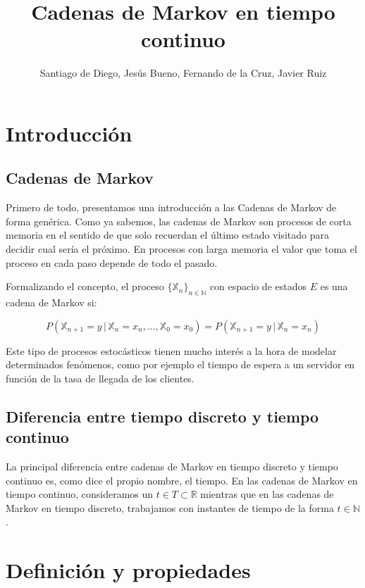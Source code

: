 \documentclass[12pt,a4paper]{article}
\author{Santiago de Diego, Jesús Bueno, Fernando de la Cruz, Javier Ruiz}
\title{Cadenas de Markov en tiempo continuo}
\date{}
\begin{document}
\maketitle
\newtheorem{theorem}{Teorema}[section]
\newtheorem{lemma}{Lema}[section]
\newtheorem{proof}{Demostración}[section]
\newpage
\tableofcontents
\newpage
\section{Introducción}
\subsection{Cadenas de Markov}
Primero de todo, presentamos una introducción a las Cadenas de Markov de forma genérica. Como ya sabemos, las cadenas de Markov son procesos de corta memoria en el sentido de que solo recuerdan el último estado visitado para decidir cual sería el próximo. En procesos con larga memoria el valor que toma el proceso en cada paso depende de todo el pasado.

Formalizando el concepto, el proceso $\{\mathbb{X}_n \}_{n\in \mathbb{N}}$ con espacio de estados $E$ es una cadena de Markov si:

$$P(\mathbb{X}_{n+1}=y \, | \, \mathbb{X}_n = x_n , \ldots , \mathbb{X}_0 = x_0)=P(\mathbb{X}_{n+1}=y \, | \, {\mathbb{X}_n=x_n})$$

Este tipo de procesos estocásticos tienen mucho interés a la hora de modelar determinados fenómenos, como por ejemplo el tiempo de espera a un servidor en función de la tasa de llegada de los clientes.

\subsection{Diferencia entre tiempo discreto y tiempo continuo}
La principal diferencia entre cadenas de Markov en tiempo discreto y tiempo continuo es, como dice el propio nombre, el tiempo. En las cadenas de Markov en tiempo continuo, consideramos un $t\in T \subset \mathbb{R}$ mientras que en las cadenas de Markov en tiempo discreto, trabajamos con instantes de tiempo de la forma $t\in \mathbb{N}$.
\section{Definición y propiedades}
\end{document}
